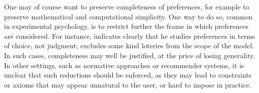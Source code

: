 \documentclass[french, english]{llncs}
\begin{document}
	One may of course want to preserve completeness of preferences, for example to preserve mathematical and computational simplicity. One way to do so, common in experimental psychology, is to restrict further the frame in which preferences are considered. For instance, \citet{luce_utility_2000} indicates clearly that he studies preferences in terms of choice, not judgment; \citet{maccrimmon_real_1980} excludes some kind loteries from the scope of the model. In such cases, completeness may well be justified, at the price of losing generality. In other settings, such as normative approaches or recommender systems, it is unclear that such reductions should be enforced, as they may lead to constraints or axioms that may appear unnatural to the user, or hard to impose in practice. 





	
\end{document}
